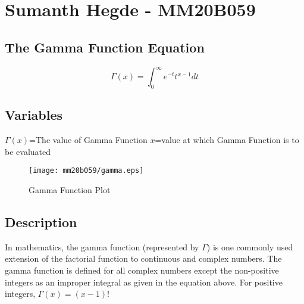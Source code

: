 


%

\section{Sumanth Hegde - MM20B059}
\subsection{The Gamma Function Equation}
{\Large$$\Gamma(x)=\int_{0}^{\infty}e^{-t}t^{x-1}dt$$}
\subsection{Variables}
$\Gamma(x)$=The value of Gamma Function\newline
$x$=value at which Gamma Function is to be evaluated
\begin{figure}[h!]
\centering
\texttt{[image: mm20b059/gamma.eps]}
\caption{Gamma Function Plot}
\label{fig:gamma}
\end{figure}

\subsection{Description}
In mathematics, the gamma function (represented by $\Gamma$) is one commonly used extension of the factorial function to continuous and complex numbers. The gamma function is defined for all complex numbers except the non-positive integers as an improper integral as given in the equation above. For positive integers, $\Gamma(x)=(x-1)!$~\cite{enwiki:1029050612}


%
%

%
